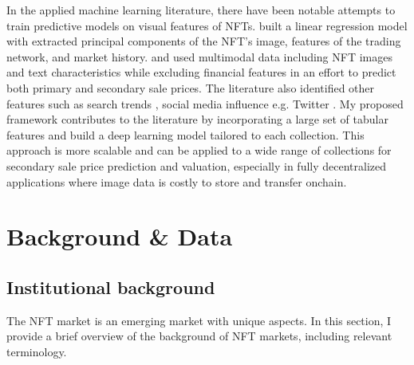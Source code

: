 \documentclass[12pt]{article}
\begin{document}
In the applied machine learning literature, there have been notable attempts to train predictive models on visual features of NFTs. \citet{nadini2021mapping} built a linear regression model with extracted principal components of the NFT's image, features of the trading network, and market history. \citet{seyhan2023nft} and \citet{costa2023show} used multimodal data including NFT images and text characteristics while excluding financial features in an effort to predict both primary and secondary sale prices. The literature also identified other features such as search trends \citep{jain2022nft,kaneko2021time}, social media influence e.g. Twitter \citep{kapoor2022tweetboost}. My proposed framework contributes to the literature by incorporating a large set of tabular features and build a deep learning model tailored to each collection. This approach is more scalable and can be applied to a wide range of collections for secondary sale price prediction and valuation, especially in fully decentralized applications where image data is costly to store and transfer onchain.


\section{Background \& Data}
\label{sec: data}

\subsection{Institutional background}
The NFT market is an emerging market with unique aspects. In this section, I provide a brief overview of the background of NFT markets, including relevant terminology.
\end{document}
